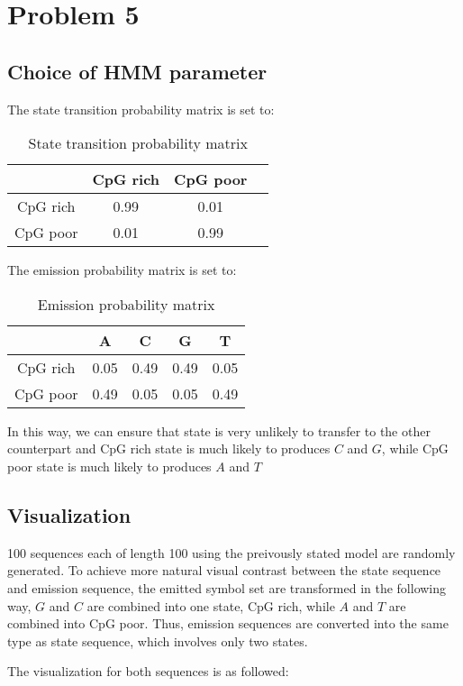 \documentclass[paper=a4, fontsize=11pt]{scrartcl} %
\numberwithin{equation}{section} %
\numberwithin{figure}{section} %
\numberwithin{table}{section} %
\begin{document}
\section{Problem 5}
\subsection {Choice of HMM parameter}

The state transition probability matrix is set to:

\begin{table}[H]
\caption{State transition probability matrix}
\centering
\begin{tabular}{c|ccc}
  & CpG rich & CpG poor  \\ \hline
  CpG rich & 0.99 & 0.01 \\
  CpG poor & 0.01 & 0.99
\end {tabular}
\end {table}


The emission probability matrix is set to:

\begin{table}[H]
\caption{Emission probability matrix}
\centering
\begin{tabular}{c|cccc}
  & A & C & G & T  \\ \hline
  CpG rich & 0.05 & 0.49 & 0.49 & 0.05 \\
  CpG poor & 0.49 & 0.05 & 0.05 & 0.49
\end {tabular}
\end {table}

In this way, we can ensure that state is very unlikely to transfer to the other counterpart and CpG rich state is much likely to produces $C$ and $G$, while CpG poor state is much likely to produces $A$ and $T$
\subsection {Visualization}

100 sequences each of length 100 using the preivously stated model are randomly generated. To achieve more natural visual contrast between the state sequence and emission sequence, the emitted symbol set are transformed in the following way, $G$ and $C$ are combined into one state, CpG rich, while $A$ and $T$ are combined into CpG poor. Thus, emission sequences are converted into the same type as state sequence, which involves only two states.

The visualization for both sequences is as followed:
\end{document}
